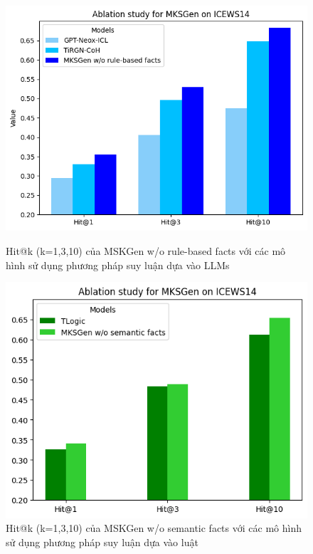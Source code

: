 \begin{figure}[ht] 
    \centering  
    \begin{minipage}[b]{0.48\textwidth}  
        \centering
        \includegraphics[width=\textwidth]{images/abl_study_1.png}  
        \caption{Hit@k (k=1,3,10) của MSKGen w/o rule-based facts với các mô hình sử dụng phương pháp suy luận dựa vào LLMs}
        \label{fig1: ablation study} 
    \end{minipage}  
    \hfill  
    \begin{minipage}[b]{0.48\textwidth}  
        \centering
        \includegraphics[width=\textwidth]{images/abl_study_2.png}  
        \caption{Hit@k (k=1,3,10) của MSKGen w/o semantic facts với các mô hình sử dụng phương pháp suy luận dựa vào luật}
        \label{fig2: ablation study}
    \end{minipage}  
     
\end{figure} 

